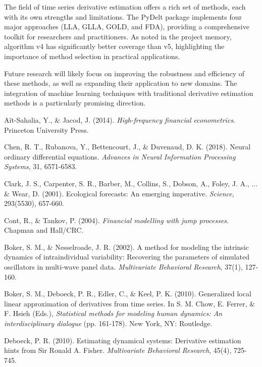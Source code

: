 \documentclass{article}
\begin{document}
The field of time series derivative estimation offers a rich set of methods, each with its own strengths and limitations. The PyDelt package implements four major approaches (LLA, GLLA, GOLD, and FDA), providing a comprehensive toolkit for researchers and practitioners. As noted in the project memory, algorithm v4 has significantly better coverage than v5, highlighting the importance of method selection in practical applications.

Future research will likely focus on improving the robustness and efficiency of these methods, as well as expanding their application to new domains. The integration of machine learning techniques with traditional derivative estimation methods is a particularly promising direction.

\begin{thebibliography}{99}

 A\"it-Sahalia, Y., \& Jacod, J. (2014). \textit{High-frequency financial econometrics}. Princeton University Press.

 Chen, R. T., Rubanova, Y., Bettencourt, J., \& Duvenaud, D. K. (2018). Neural ordinary differential equations. \textit{Advances in Neural Information Processing Systems}, 31, 6571-6583.

 Clark, J. S., Carpenter, S. R., Barber, M., Collins, S., Dobson, A., Foley, J. A., ... \& Wear, D. (2001). Ecological forecasts: An emerging imperative. \textit{Science}, 293(5530), 657-660.

 Cont, R., \& Tankov, P. (2004). \textit{Financial modelling with jump processes}. Chapman and Hall/CRC.

 Boker, S. M., \& Nesselroade, J. R. (2002). A method for modeling the intrinsic dynamics of intraindividual variability: Recovering the parameters of simulated oscillators in multi-wave panel data. \textit{Multivariate Behavioral Research}, 37(1), 127-160.

 Boker, S. M., Deboeck, P. R., Edler, C., \& Keel, P. K. (2010). Generalized local linear approximation of derivatives from time series. In S. M. Chow, E. Ferrer, \& F. Hsieh (Eds.), \textit{Statistical methods for modeling human dynamics: An interdisciplinary dialogue} (pp. 161-178). New York, NY: Routledge.

 Deboeck, P. R. (2010). Estimating dynamical systems: Derivative estimation hints from Sir Ronald A. Fisher. \textit{Multivariate Behavioral Research}, 45(4), 725-745.


\end{thebibliography}
\end{document}
